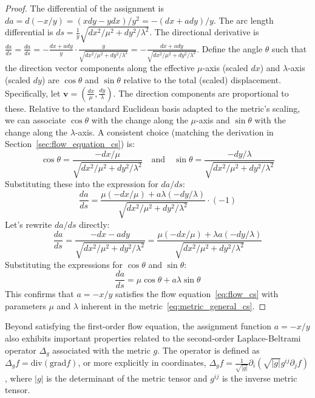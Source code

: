 \documentclass[12pt]{article}
\begin{document}
\begin{proof}
The differential of the assignment is \( da = d(-x/y) = (x dy - y dx) / y^2 = -(dx + a dy) / y \).
The arc length differential is \( ds = \frac{1}{y} \sqrt{dx^2/\mu^2 + dy^2/\lambda^2} \).
The directional derivative is \( \frac{da}{ds} = \frac{da}{ds} = -\frac{dx + a dy}{y} \cdot \frac{y}{\sqrt{dx^2/\mu^2 + dy^2/\lambda^2}} = -\frac{dx + a dy}{\sqrt{dx^2/\mu^2 + dy^2/\lambda^2}} \).
Define the angle \( \theta \) such that the direction vector components along the effective \( \mu \)-axis (scaled \( dx \)) and \( \lambda \)-axis (scaled \( dy \)) are \( \cos \theta \) and \( \sin \theta \) relative to the total (scaled) displacement. Specifically, let \( \mathbf{v} = (\frac{dx}{\mu}, \frac{dy}{\lambda}) \). The direction components are proportional to these. Relative to the standard Euclidean basis adapted to the metric's scaling, we can associate \( \cos \theta \) with the change along the \( \mu \)-axis and \( \sin \theta \) with the change along the \( \lambda \)-axis. A consistent choice (matching the derivation in Section~\ref{sec:flow_equation_cs}) is:
\[
\cos \theta = \frac{-dx/\mu}{\sqrt{dx^2/\mu^2 + dy^2/\lambda^2}} \quad \text{and} \quad \sin \theta = \frac{-dy/\lambda}{\sqrt{dx^2/\mu^2 + dy^2/\lambda^2}}
\]
Substituting these into the expression for \( da/ds \):
\[
\frac{da}{ds} = \frac{\mu (-dx/\mu) + a \lambda (-dy/\lambda)}{\sqrt{dx^2/\mu^2 + dy^2/\lambda^2}} \cdot (-1) %
\]
Let's rewrite \( da/ds \) directly:
\[
\frac{da}{ds} = \frac{-dx - a dy}{\sqrt{dx^2/\mu^2 + dy^2/\lambda^2}} = \frac{\mu(-dx/\mu) + \lambda a (-dy/\lambda)}{\sqrt{dx^2/\mu^2 + dy^2/\lambda^2}}
\]
Substituting the expressions for \( \cos \theta \) and \( \sin \theta \):
\[
\frac{da}{ds} = \mu \cos \theta + a \lambda \sin \theta
\]
This confirms that \( a = -x/y \) satisfies the flow equation~\eqref{eq:flow_cs} with parameters \( \mu \) and \( \lambda \) inherent in the metric~\eqref{eq:metric_general_cs}.
\end{proof}

Beyond satisfying the first-order flow equation, the assignment function \( a = -x/y \) also exhibits important properties related to the second-order Laplace-Beltrami operator \( \Delta_g \) associated with the metric \( g \). The operator is defined as \( \Delta_g f = \text{div}( \text{grad} f ) \), or more explicitly in coordinates, \( \Delta_g f = \frac{1}{\sqrt{|g|}} \partial_i (\sqrt{|g|} g^{ij} \partial_j f) \), where \( |g| \) is the determinant of the metric tensor and \( g^{ij} \) is the inverse metric tensor.
\end{document}
